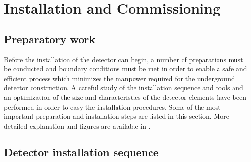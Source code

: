 \section{Installation and Commissioning}
\label{sec:detectors-fd-alt-install}

\subsection{Preparatory work}

Before the installation of the detector can begin, a number of
preparations must be conducted and boundary conditions must be met in
order to enable a safe and efficient process which minimizes the
manpower required for the underground detector construction. A careful
study of the installation sequence and tools and an optimization of
the size and characteristics of the detector elements have been
performed in order to easy the installation procedures. Some of the
most important preparation and installation steps are listed in this
section. More detailed explanation and figures are available in
\anxlbnob.

\subsection{Detector installation sequence}

